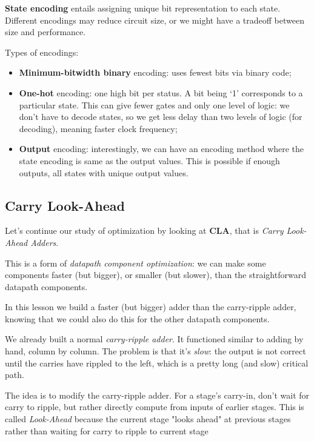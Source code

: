 \documentclass[a4paper,11pt]{article}
\begin{document}
\textbf{State encoding} entails assigning unique bit representation to each state.
Different encodings may reduce circuit size, or we might have a tradeoff between size and performance.

Types of encodings:
\begin{itemize}
	\item \textbf{Minimum-bitwidth binary} encoding: uses fewest bits via binary code;
	\item \textbf{One-hot} encoding: one high bit per status. A bit being ‘1’ corresponds to a particular state. This can give fewer gates and only one level of logic: we don't have to decode states, so we get less delay than two levels of logic (for decoding), meaning faster clock frequency;
	\item \textbf{Output} encoding: interestingly, we can have an encoding method where the state encoding is same as the output values. This is possible if enough outputs, all states with unique output values.
\end{itemize}

\subsection{Carry Look-Ahead}

Let's continue our study of optimization by looking at \textbf{CLA}, that is \textit{Carry Look-Ahead Adders}.

This is a form of \textit{datapath component optimization}: we can make some components faster (but bigger), or smaller (but slower), than the straightforward datapath components.

In this lesson we build a faster (but bigger) adder than the carry-ripple adder, knowing that we could also do this for the other datapath components.

We already built a normal \textit{carry-ripple adder}.
It functioned similar to adding by hand, column by column.
The problem is that it's \textit{slow}: the output is not correct until the carries have rippled to the left, which is a pretty long (and slow) critical path.

\par\smallskip

The idea is to modify the carry-ripple adder.
For a stage’s carry-in, don’t wait for carry to ripple, but rather directly compute from inputs of earlier stages.
This is called \textit{Look-Ahead} because the current stage "looks ahead" at previous stages rather than waiting for carry to ripple to current stage
\end{document}
